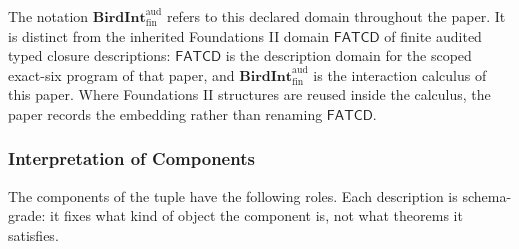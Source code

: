 \documentclass[11pt]{article}
\theoremstyle{definition}
\begin{document}
The notation \(\mathbf{BirdInt}^{\mathrm{aud}}_{\mathrm{fin}}\) refers to this declared domain throughout the paper. It is distinct from the inherited Foundations II domain \(\mathsf{FATCD}\) of finite audited typed closure descriptions: \(\mathsf{FATCD}\) is the description domain for the scoped exact-six program of that paper, and \(\mathbf{BirdInt}^{\mathrm{aud}}_{\mathrm{fin}}\) is the interaction calculus of this paper. Where Foundations II structures are reused inside the calculus, the paper records the embedding rather than renaming \(\mathsf{FATCD}\).

\subsubsection{Interpretation of Components}

The components of the tuple have the following roles. Each description is schema-grade: it fixes what kind of object the component is, not what theorems it satisfies.
\end{document}
